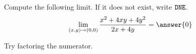 \documentclass{ximera}
\author{Jim Talamo \and Bart Snapp}
\newcommand{\point}[1]{\left(#1\right)} %
\begin{document}
\begin{exercise}
  Compute the following limit. If it does not exist, write $\verb|DNE|$.
  \[
  \lim_{\point{x,y}\to \point{0,0}}\frac{x^2+4xy+4y^2}{2x+4y} = \answer{0}
  \]
  
  \begin{hint}
Try factoring the numerator. 
  \end{hint}
\end{exercise}
\end{document}
